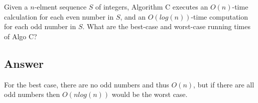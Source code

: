 \documentclass{article}
\begin{document}
Given a \(n\)-elment sequence \(S\) of integers, Algorithm C executes an
\(O(n)\)-time calculation for each even number in \(S\), and an
\(O(log(n))\)-time computation for each odd number in \(S\). What are the
best-case and worst-case running times of Algo C?



\subsection{Answer}

\begin{mdframed}

  For the best case, there are no odd numbers and thus \(O(n)\), but if there
  are all odd numbers then \(O(nlog(n))\) would be the worst case.

\end{mdframed}
\end{document}
